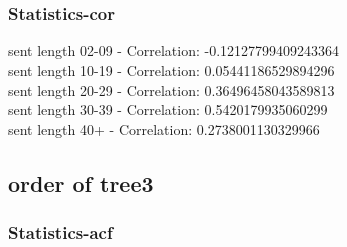 \documentclass{article}%
\begin{document}
\begin{figure}[ht]%
\centering%
\setlength{\abovecaptionskip}{-35pt}%
%
%
\\%
%
%
\\%
%
\end{figure}

%
\newpage%
\subsubsection{Statistics{-}cor}%
\label{ssubsec:Statistics{-}cor}%
\noindent%
sent length 02-09 - Correlation: -0.12127799409243364\\%
sent length 10-19 - Correlation: 0.05441186529894296\\%
sent length 20-29 - Correlation: 0.36496458043589813\\%
sent length 30-39 - Correlation: 0.5420179935060299\\%
sent length 40+ - Correlation: 0.2738001130329966\\

%
\newpage

%
\subsection{order of tree3}%
\label{subsec:orderoftree3}%
\subsubsection{Statistics{-}acf}%
\label{ssubsec:Statistics{-}acf}%
\end{document}
